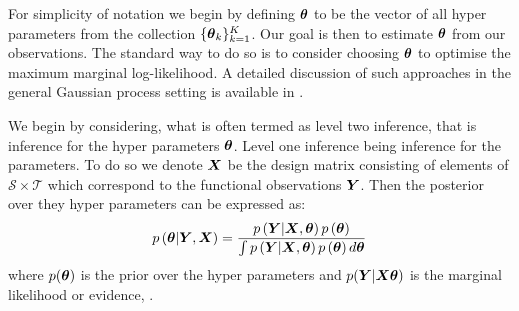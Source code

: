 For simplicity of notation we begin by defining $\bm{{\theta}}$ to be the vector of all hyper parameters from the collection $\{\bm{{\theta}}_{k}\}_{k=1}^K$. 
Our goal is then to estimate $\bm{{\theta}}$ from our observations. 
The standard way to do so is to consider choosing $\bm{{\theta}}$ to optimise the maximum marginal log-likelihood. 
A detailed discussion of such approaches in the general Gaussian process setting is available in \citep{williams_gaussian_2006}.

We begin by considering, what is often termed as level two inference, that is inference for the hyper parameters $\bm{{\theta}}$. 
Level one inference being inference for the parameters. 
To do so we denote $\bm{{X}}$ be the design matrix consisting of elements of $\mathcal{S} \times \mathcal{T}$ which correspond to the functional observations $\bm{{Y}}$. 
Then the posterior over they hyper parameters can be expressed as:
\begin{equation}
	p\left(\bm{{\theta}} | \bm{{Y}},  \bm{{X}} \right) = \frac{p\left(\bm{{Y}} | \bm{{X}}, \bm{{\theta}}\right) p\left(\bm{{\theta}}\right)}{\int p\left(\bm{{Y}} | \bm{{X}}, \bm{{\theta}}\right) p\left(\bm{{\theta}}\right) d\bm{{\theta}}} 
	\label{eqn:bayes_cpace}
\end{equation}
where $p(\bm{{\theta}})$ is the prior over the hyper parameters and $p(\bm{{Y}}| \bm{{X}} \bm{{\theta}})$ is the marginal likelihood or evidence, \citep{williams_gaussian_2006}.

